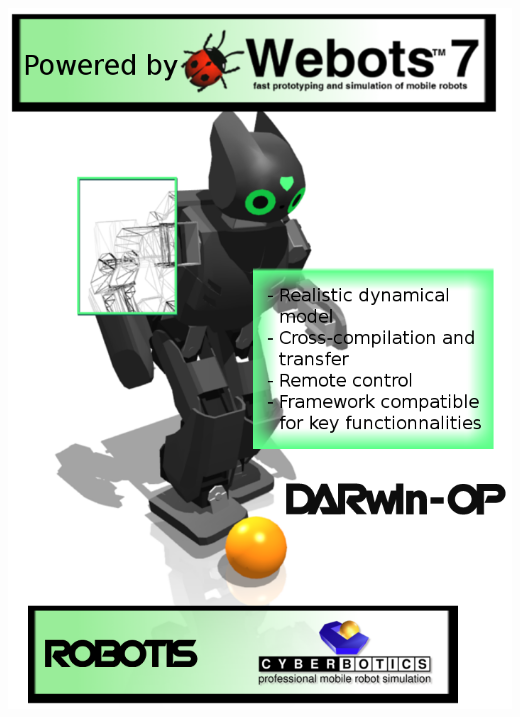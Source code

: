\documentclass[a4paper, 12pt]{article}  		%
\begin{document}
	

\begin{titlepage}
\begin{center}
\includegraphics[width=17cm]{darwin-op.png}
\end{center}
\end{titlepage}




\newpage

\thispagestyle{empty}
\setcounter{page}{0}
\end{document}
